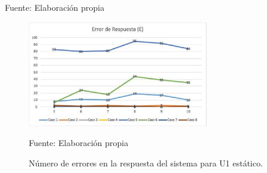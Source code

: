 \begin{center}
\begin{table}[H]
\centering
\caption{\small{Resultados para el caso 6 con U1 estático.}}
\label{table:tabla4.31}
\vskip 0.2cm
\begin{center}
\vskip 0.2cm
{\small{Fuente: Elaboración propia}}
\end{center}
\end{table}
\end{center}


\begin{figure}[H]
\begin{center}
\includegraphics[width=0.7\textwidth]{Imagenes/Cap4/image009}
\end{center}
\begin{center}
\vskip -0.5cm
\caption{\small{Número de errores en la respuesta del sistema para U1 estático.}}
\label{fig:figura4.9}
{\small{Fuente: Elaboración propia}}
\end{center}
\end{figure}

\vskip -1.0cm

